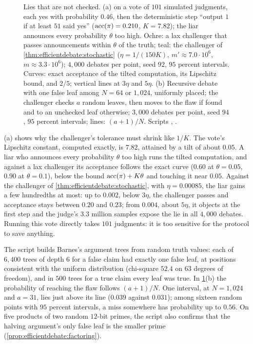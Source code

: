 \begin{refsection}
\begin{figure}[t]
\caption{Lies that are not checked. (a)  on a vote of $101$ simulated judgments, each yes with probability $0.46$, then the deterministic step ``output $1$ if at least $51$ said yes'' ($\operatorname{acc}(\pi)=0.210$, $K=7.82$); the liar announces every probability $\theta$ too high. Ochre: a lax challenger that passes announcements within $\theta$ of the truth; teal: the challenger of \cref{thm:efficientdebate:stochastic} ($\eta=1/(150K)$, $m'\approx7.0\cdot10^6$, $m\approx3.3\cdot10^6$); $4{,}000$ debates per point, seed $92$, $95$ percent intervals. Curves: exact acceptance of the tilted computation, its Lipschitz bound, and $2/5$; vertical lines at $3\eta$ and $5\eta$. (b) Recursive debate with one false leaf among $N=64$ or $1{,}024$, uniformly placed; the challenger checks $a$ random leaves, then moves to the flaw if found and to an unchecked leaf otherwise; $3{,}000$ debates per point, seed $94$, $95$ percent intervals; lines: $(a+1)/N$. Scripts , .}
\label{fig:efficientdebate:lies}
\end{figure}

(a) shows why the challenger's tolerance must shrink like $1/K$. The vote's Lipschitz constant, computed exactly, is $7.82$, attained by a tilt of about $0.05$. A liar who announces every probability $\theta$ too high runs the tilted computation, and against a lax challenger its acceptance follows the exact curve ($0.60$ at $\theta=0.05$, $0.90$ at $\theta=0.1$), below the bound $\operatorname{acc}(\pi)+K\theta$ and touching it near $0.05$. Against the challenger of \cref{thm:efficientdebate:stochastic}, with $\eta=0.00085$, the liar gains a few hundredths at most: up to $0.002$, below $3\eta$, the challenger passes and acceptance stays between $0.20$ and $0.23$; from $0.004$, about $5\eta$, it objects at the first step and the judge's $3.3$ million samples expose the lie in all $4{,}000$ debates. Running this vote directly takes $101$ judgments: it is too sensitive for the protocol to save anything.

The script  builds Barnes's argument trees from random truth values: each of $6{,}400$ trees of depth $6$ for a false claim had exactly one false leaf, at positions consistent with the uniform distribution (chi-square $52.4$ on $63$ degrees of freedom), and in $500$ trees for a true claim every leaf was true. In \cref{fig:efficientdebate:lies}(b) the probability of reaching the flaw follows $(a+1)/N$. One interval, at $N=1{,}024$ and $a=31$, lies just above its line ($0.039$ against $0.031$); among sixteen random points with $95$ percent intervals, a miss somewhere has probability up to $0.56$. On five products of two random $12$-bit primes, the script also confirms that the halving argument's only false leaf is the smaller prime (\cref{prop:efficientdebate:factoring}).


\end{refsection}
